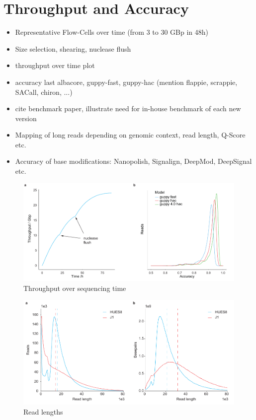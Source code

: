 \section{Throughput and Accuracy}
\label{sec:stat_of_art:throughput}

\begin{itemize}
    \item Representative Flow-Cells over time (from 3 to 30 GBp in 48h)
    \item Size selection, shearing, nuclease flush
    \item throughput over time plot
    \item accuracy last albacore, guppy-fast, guppy-hac (mention flappie, scrappie, SACall, chiron, ...)
    \item cite benchmark paper, illustrate need for in-house benchmark of each new version
    \item Mapping of long reads depending on genomic context, read length, Q-Score etc.
    \item Accuracy of base modifications: Nanopolish, Signalign, DeepMod, DeepSignal etc.
\end{itemize}

\begin{figure}[h]
    \centering
    \includegraphics[width=1.0\textwidth]{figures/state_of_art/throughput.pdf}
    \captionsetup{format=plain}
    \caption[Throughput and accuracy]{Throughput over sequencing time}
    \label{fig:state_of_art:throughput}
\end{figure}

\begin{figure}[h]
    \centering
    \includegraphics[width=1.0\textwidth]{figures/state_of_art/read_length.pdf}
    \captionsetup{format=plain}
    \caption[Read length median and N50]{Read lengths}
    \label{fig:state_of_art:read_length}
\end{figure}